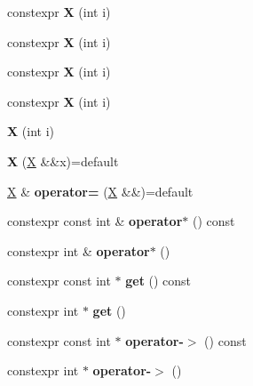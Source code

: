 \begin{DoxyCompactItemize}
constexpr {\bfseries X} (int i)
\item 
\mbox{\label{class_x_acb10a534a7ab0dafa80c9ff2401e41bf}} 
constexpr {\bfseries X} (int i)
\item 
\mbox{\label{class_x_acb10a534a7ab0dafa80c9ff2401e41bf}} 
constexpr {\bfseries X} (int i)
\item 
\mbox{\label{class_x_acb10a534a7ab0dafa80c9ff2401e41bf}} 
constexpr {\bfseries X} (int i)
\item 
\mbox{\label{class_x_ab821891e399ee066c77b3234b63f128f}} 
{\bfseries X} (int i)
\item 
\mbox{\label{class_x_a72a02bb181dba9d20f21eb12ac8a278e}} 
{\bfseries X} (\mbox{\hyperlink{class_x}{X}} \&\&x)=default
\item 
\mbox{\label{class_x_a5d5d7c57342a046ac39fc6344cae1a76}} 
\mbox{\hyperlink{class_x}{X}} \& {\bfseries operator=} (\mbox{\hyperlink{class_x}{X}} \&\&)=default
\item 
\mbox{\label{class_x_a5286f99ed2be80f64c0d38afb9b811c4}} 
constexpr const int \& {\bfseries operator$\ast$} () const
\item 
\mbox{\label{class_x_ad7e9d164075fee2529faf624ba52aae6}} 
constexpr int \& {\bfseries operator$\ast$} ()
\item 
\mbox{\label{class_x_a59298fc40ccb06b697e2bcecc7446987}} 
constexpr const int $\ast$ {\bfseries get} () const
\item 
\mbox{\label{class_x_a157104d3ffc73c522a1cd7a0ab5749ad}} 
constexpr int $\ast$ {\bfseries get} ()
\item 
\mbox{\label{class_x_a49f53d53a444d09483cb2d2058231a18}} 
constexpr const int $\ast$ {\bfseries operator-\/$>$} () const
\item 
\mbox{\label{class_x_aca1741653cf8e27094a38fb814bd6db0}} 
constexpr int $\ast$ {\bfseries operator-\/$>$} ()
\item 
\mbox{\label{class_x_acb10a534a7ab0dafa80c9ff2401e41bf}} 

\end{DoxyCompactItemize}
